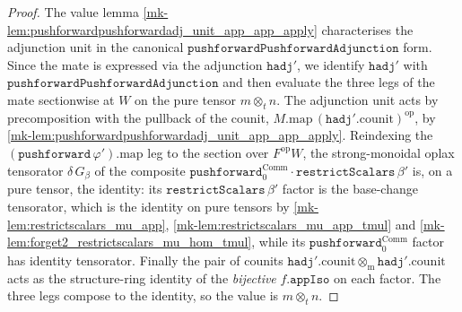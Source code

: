 \begin{proof}
  \leanok
  The value lemma \ref{mk-lem:pushforwardpushforwardadj_unit_app_app_apply} characterises the
  adjunction unit in the canonical \(\mathtt{pushforwardPushforwardAdjunction}\) form. Since the
  mate is expressed via the adjunction \(\mathtt{hadj}'\), we identify \(\mathtt{hadj}'\) with
  \(\mathtt{pushforwardPushforwardAdjunction}\) and then evaluate the three legs of the mate
  sectionwise at \(W\) on the pure tensor
  \(m \otimes_t n\). The adjunction unit acts by precomposition with the pullback of the counit,
  \(M.\mathrm{map}\,(\mathtt{hadj}'.\mathrm{counit})^{\mathrm{op}}\), by
  \ref{mk-lem:pushforwardpushforwardadj_unit_app_app_apply}. Reindexing the
  \((\mathtt{pushforward}\,\varphi').\mathrm{map}\) leg to the section over \(F^{\mathrm{op}}W\), the
  strong-monoidal oplax tensorator \(\delta\,G_\beta\) of the composite
  \(\mathtt{pushforward}_0^{\mathrm{Comm}} \cdot \mathtt{restrictScalars}\,\beta'\) is, on a pure
  tensor, the identity: its \(\mathtt{restrictScalars}\,\beta'\) factor is the base-change tensorator,
  which is the identity on pure tensors by \ref{mk-lem:restrictscalars_mu_app},
  \ref{mk-lem:restrictscalars_mu_app_tmul} and \ref{mk-lem:forget2_restrictscalars_mu_hom_tmul}, while its
  \(\mathtt{pushforward}_0^{\mathrm{Comm}}\) factor has identity tensorator. Finally the pair of
  counits \(\mathtt{hadj}'.\mathrm{counit} \otimes_{\mathrm m} \mathtt{hadj}'.\mathrm{counit}\) acts as
  the structure-ring identity of the \emph{bijective} \(f.\mathtt{appIso}\) on each factor. The three
  legs compose to the identity, so the value is \(m \otimes_t n\).


\end{proof}
